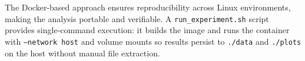 \documentclass[11pt]{article}
\begin{document}
The Docker-based approach ensures reproducibility across Linux environments, making the analysis portable and verifiable. A \texttt{run\_experiment.sh} script provides single-command execution: it builds the image and runs the container with \texttt{--network host} and volume mounts so results persist to \texttt{./data} and \texttt{./plots} on the host without manual file extraction.
\end{document}
